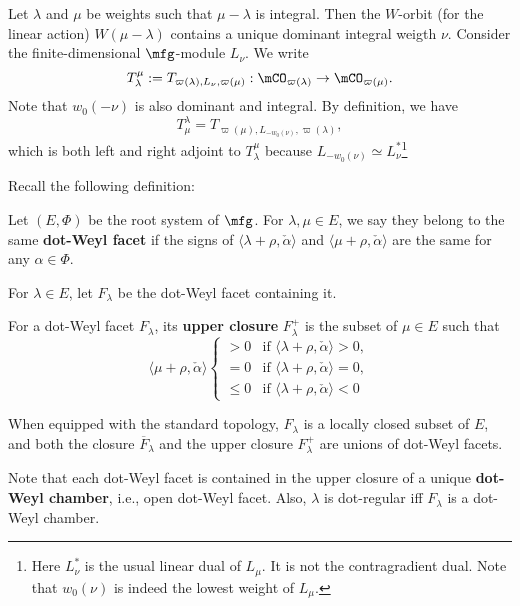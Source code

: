 	\begin{constr}
		Let $\lambda$ and $\mu$ be weights such that $\mu - \lambda$ is integral. Then the $W$-orbit (for the linear action) $W(\mu-\lambda)$ contains a unique dominant integral weigth $\nu$. Consider the finite-dimensional $\mfg$-module $L_\nu$. We write
		\[
			T_\lambda^\mu:= T_{\varpi(\lambda), L_\nu, \varpi(\mu)} : \mCO_{\varpi(\lambda)} \to \mCO_{\varpi(\mu)}.
		\] 
		Note that $w_0(-\nu)$ is also dominant and integral. By definition, we have
		\[
			T_\mu^\lambda = T_{\varpi(\mu), L_{-w_0(\nu)}, \varpi(\lambda)},
		\]
		which is both left and right adjoint to $T_\lambda^\mu$ because $L_{-w_0(\nu)} \simeq L_\nu^*$\footnote{Here $L_\nu^*$ is the usual linear dual of $L_\mu$. It is not the contragradient dual. Note that $w_0(\nu)$ is indeed the lowest weight of $L_\mu$.}
	\end{constr}

	Recall the following definition:

	\begin{defn}
		Let $(E,\Phi)$ be the root system of $\mfg$. For $\lambda,\mu \in E$, we say they belong to the same \textbf{dot-Weyl facet} if the signs of $\langle \lambda+\rho , \check\alpha \rangle$ and $\langle \mu+\rho , \check\alpha \rangle$ are the same for any $\alpha\in \Phi$. 

		For $\lambda\in E$, let $F_\lambda$ be the dot-Weyl facet containing it.
	\end{defn}

	

	\begin{defn}
		For a dot-Weyl facet $F_\lambda$, its \textbf{upper closure} $F_\lambda^+$ is the subset of $\mu\in E$ such that
		\[
			\langle \mu+\rho,\check \alpha \rangle \left\{ 
			\begin{array}{rcl}  
						> 0	&	\textrm{if } \langle \lambda+\rho,\check \alpha \rangle>0,\\
						=0	&	\textrm{if } \langle \lambda+\rho,\check \alpha \rangle=0,\\
						\le 0	&	\textrm{if } \langle \lambda+\rho,\check \alpha \rangle<0
			\end{array}\right.
		\]
	\end{defn}

	\begin{rem}
		When equipped with the standard topology, $F_\lambda$ is a locally closed subset of $E$, and both the closure $\overline{F}_\lambda$ and the upper closure $F_\lambda^+$ are unions of dot-Weyl facets. 

		Note that each dot-Weyl facet is contained in the upper closure of a unique \textbf{dot-Weyl chamber}, i.e., open dot-Weyl facet. Also, $\lambda$ is dot-regular iff $F_\lambda$ is a dot-Weyl chamber.
	\end{rem}

